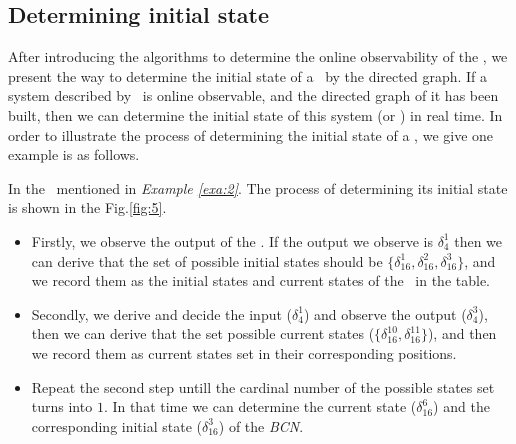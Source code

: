 \subsection{Determining initial state}

After introducing the algorithms to determine the online observability of the \BCNs, we present the way to determine the initial state of a \BCN\ by the directed graph. If a system described by \BCN\ is online observable, and the directed graph of it has been built, then we can determine the initial state of this system (or \BCN) in real time. In order to illustrate the process of determining the initial state of a \BCN, we give one example is as follows.
\begin{example}
In the \BCN\ mentioned in {\em Example \ref{exa:2}}. The process of determining its initial state is shown in the Fig.\ref{fig:5}. 
\begin{itemize}
  \item Firstly, we observe the output of the \BCN. If the output we observe is $\delta_4^1$ then we can derive that the set of possible initial states should be $\{\delta_{16}^1,\delta_{16}^2,\delta_{16}^3\}$, and we record them as the initial states and current states of the \BCN\ in the table. 
  \item Secondly, we derive and decide the input ($\delta_4^1$) and observe the output ($\delta_4^3$), then we can derive that the set possible current states ($\{\delta_{16}^{10},\delta_{16}^{11}\}$), and then we record them as current states set in their corresponding positions. 
 \item Repeat the second step untill the cardinal number of the possible states set turns into $1$. In that time we can determine the current state ($\delta_{16}^{6}$) and the corresponding initial state  ($\delta_{16}^{3}$) of the {\em BCN}.
\end{itemize} 
\end{example}   

